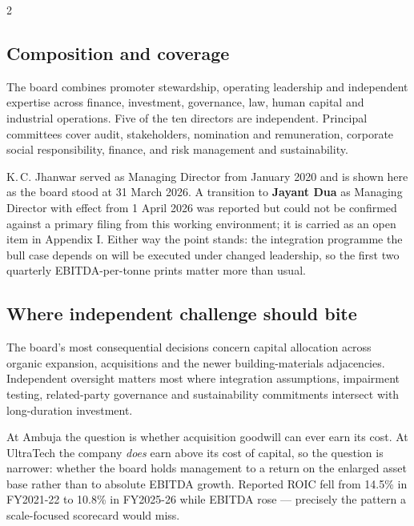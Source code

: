 \vspace{6mm}
\begin{paracol}{2}
\subsection*{Composition and coverage}

The board combines promoter stewardship, operating leadership and independent
expertise across finance, investment, governance, law, human capital and industrial
operations. Five of the ten directors are independent. Principal committees cover
audit, stakeholders, nomination and remuneration, corporate social responsibility,
finance, and risk management and sustainability.

\begin{notebox}
K.\,C. Jhanwar served as Managing Director from January 2020 and is shown here as the
board stood at 31 March 2026. A transition to \textbf{Jayant Dua} as Managing
Director with effect from 1 April 2026 was reported but could not be confirmed
against a primary filing from this working environment; it is carried as an open item
in Appendix I. Either way the point stands: the integration programme the bull case
depends on will be executed under changed leadership, so the first two quarterly
EBITDA-per-tonne prints matter more than usual.
\end{notebox}

\switchcolumn
\subsection*{Where independent challenge should bite}

The board's most consequential decisions concern capital allocation across organic
expansion, acquisitions and the newer building-materials adjacencies. Independent
oversight matters most where integration assumptions, impairment testing,
related-party governance and sustainability commitments intersect with long-duration
investment.

\begin{keybox}
At Ambuja the question is whether acquisition goodwill can ever earn its cost. At
UltraTech the company \emph{does} earn above its cost of capital, so the question is
narrower: whether the board holds management to a return on the enlarged asset base
rather than to absolute EBITDA growth. Reported ROIC fell from 14.5\% in FY2021-22 to
10.8\% in FY2025-26 while EBITDA rose — precisely the pattern a scale-focused
scorecard would miss.
\end{keybox}
\end{paracol}

